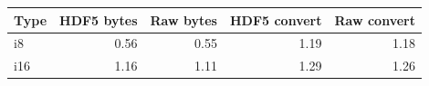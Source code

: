 \begin{tabularx}{\linewidth}{@{}Xrrrr@{}}\toprule
Type & HDF5 bytes & Raw bytes & HDF5 convert & Raw convert\\\midrule
i8 & 0.56 & 0.55 & 1.19 & 1.18 \\
i16 & 1.16 & 1.11 & 1.29 & 1.26 \\
\bottomrule
\end{tabularx}

